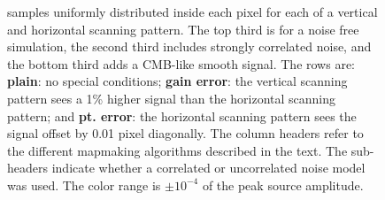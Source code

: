 \documentclass{article}
\newcommand{\dfn}[1]{\textbf{#1}}
\begin{document}
\begin{figure}[ph!]
{		samples uniformly distributed inside each pixel for each of a vertical and
		horizontal scanning pattern. The top third is for a noise free
		simulation, the second third includes strongly correlated noise,
		and the bottom third adds a CMB-like smooth signal.
		The rows are: \dfn{plain}: no special conditions; \dfn{gain error}:
		the vertical scanning pattern sees a 1\% higher signal than the horizontal
		scanning pattern; and \dfn{pt. error}: the horizontal scanning pattern
		sees the signal offset by 0.01 pixel diagonally. The column headers refer to
		the different mapmaking algorithms described in the text. The sub-headers
		indicate whether a correlated or uncorrelated noise model was used. The
		color range is $\pm 10^{-4}$ of the peak source amplitude.}
	\label{fig:srcleak}
\end{figure}
\end{document}
